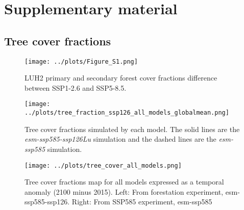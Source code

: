 \documentclass[]{article}
\begin{document}
\printbibliography

\section{Supplementary material}
\setcounter{figure}{0}

\subsection{Tree cover fractions}

\begin{figure}[H]
    \centering
    \texttt{[image: ../plots/Figure\_S1.png]}
    \caption{LUH2 primary and secondary forest cover fractions difference between SSP1-2.6 and SSP5-8.5.}
    \label{fig:LUH2DIFF}
\end{figure}

\begin{figure}[H]
    \centering
    \texttt{[image: ../plots/tree\_fraction\_ssp126\_all\_models\_globalmean.png]}
    \caption{Tree cover fractions simulated by each model. The solid lines are the \textit{esm-ssp585-ssp126Lu} simulation and the dashed lines are the \textit{esm-ssp585} simulation.}
    \label{fig:tree_fractions_models}
\end{figure}

\begin{figure}[H]
    \centering
    \texttt{[image: ../plots/tree\_cover\_all\_models.png]}
    \caption{Tree cover fractions map for all models expressed as a temporal anomaly (2100 minus 2015). Left: From forestation experiment, esm-ssp585-ssp126. Right: From SSP585 experiment, esm-ssp585}
    \label{fig:tree_area_maps_ssp126Lu}
\end{figure}
\end{document}
